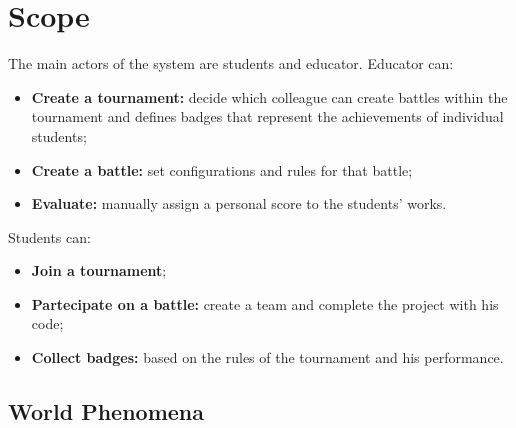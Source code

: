 \section{Scope}
The main actors of the system are students and educator. Educator can:
\begin{itemize}
    \item \textbf{Create a tournament:} decide which colleague can create battles within the tournament and defines badges 
    that represent the achievements of individual students; 
    \item \textbf{Create a battle:} set configurations and rules for that battle;
    \item \textbf{Evaluate:} manually assign a personal score to the students' works.
\end{itemize}

Students can:
\begin{itemize}
    \item \textbf{Join a tournament};
    \item \textbf{Partecipate on a battle:} create a team and complete the project with his code;
    \item \textbf{Collect badges:} based on the rules of the tournament and his performance.
\end{itemize}

\subsection{World Phenomena}

\begin{table}[H]
    \centering
    \end{table}
    \clearpage

